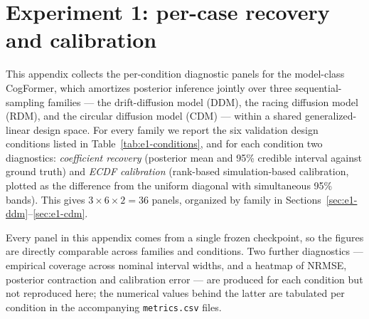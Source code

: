 %
%
%
%

\renewcommand{\topfraction}{0.92}
\renewcommand{\bottomfraction}{0.7}
\renewcommand{\textfraction}{0.06}
\renewcommand{\floatpagefraction}{0.6}

\section{Experiment 1: per-case recovery and calibration}
\label{app:experiment-1-figures}

This appendix collects the per-condition diagnostic panels for the model-class
CogFormer, which amortizes posterior inference jointly over three
sequential-sampling families --- the drift-diffusion model (DDM), the racing
diffusion model (RDM), and the circular diffusion model (CDM) --- within a
shared generalized-linear design space. For every family we report the six
validation design conditions listed in Table~\ref{tab:e1-conditions}, and for
each condition two diagnostics: \emph{coefficient recovery} (posterior mean and
95\% credible interval against ground truth) and \emph{ECDF calibration}
(rank-based simulation-based calibration, plotted as the difference from the
uniform diagonal with simultaneous 95\% bands). This gives
$3 \times 6 \times 2 = 36$ panels, organized by family in
Sections~\ref{sec:e1-ddm}--\ref{sec:e1-cdm}.

Every panel in this appendix comes from a single frozen checkpoint, so the
figures are directly comparable across families and conditions. Two further
diagnostics --- empirical coverage across nominal interval widths, and a
heatmap of NRMSE, posterior contraction and calibration error --- are produced
for each condition but not reproduced here; the numerical values behind the
latter are tabulated per condition in the accompanying \texttt{metrics.csv}
files.

